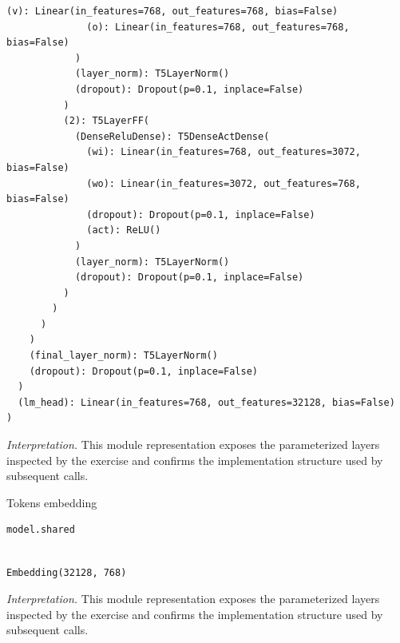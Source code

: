 \documentclass[../labs.tex]{subfiles}
\begin{document}
\begin{lstlisting}[basicstyle=\ttfamily\scriptsize,breaklines=true,breakatwhitespace=false,columns=fullflexible,keepspaces=true]
              (v): Linear(in_features=768, out_features=768, bias=False)
              (o): Linear(in_features=768, out_features=768, bias=False)
            )
            (layer_norm): T5LayerNorm()
            (dropout): Dropout(p=0.1, inplace=False)
          )
          (2): T5LayerFF(
            (DenseReluDense): T5DenseActDense(
              (wi): Linear(in_features=768, out_features=3072, bias=False)
              (wo): Linear(in_features=3072, out_features=768, bias=False)
              (dropout): Dropout(p=0.1, inplace=False)
              (act): ReLU()
            )
            (layer_norm): T5LayerNorm()
            (dropout): Dropout(p=0.1, inplace=False)
          )
        )
      )
    )
    (final_layer_norm): T5LayerNorm()
    (dropout): Dropout(p=0.1, inplace=False)
  )
  (lm_head): Linear(in_features=768, out_features=32128, bias=False)
)

\end{lstlisting}

\noindent\emph{Interpretation.} This module representation exposes the parameterized layers inspected by the exercise and confirms the implementation structure used by subsequent calls.



\noindent Tokens embedding

\begin{lstlisting}[language=Python,basicstyle=\ttfamily\scriptsize,breaklines=true,breakatwhitespace=false,columns=fullflexible,keepspaces=true,numbers=none]
model.shared
\end{lstlisting}

\hypertarget{res:lab02-text-01-t5-ipynb-47-b10c9c9b642c}{}

\begin{lstlisting}[basicstyle=\ttfamily\scriptsize,breaklines=true,breakatwhitespace=false,columns=fullflexible,keepspaces=true]

Embedding(32128, 768)

\end{lstlisting}

\noindent\emph{Interpretation.} This module representation exposes the parameterized layers inspected by the exercise and confirms the implementation structure used by subsequent calls.

\end{document}

